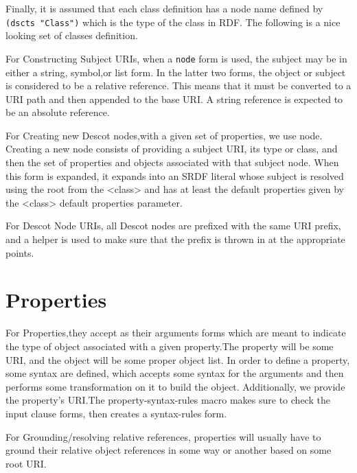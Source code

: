 Finally, it is assumed that each class definition has a node name defined 
by {\tt (dscts "Class")} which is the type of the class in RDF.
The following is a nice looking set of classes definition.

For Constructing Subject URIs, when a {\tt node} form is used, the subject
may be in either a string, symbol,or list form. In the latter two forms, 
the object or subject is considered to be a relative reference. This
means that it must be converted to a URI path and then appended to the 
base URI. A string reference is expected to be an absolute reference.

For Creating new Descot nodes,with a given set of properties, we use node.
Creating a new node consists of providing a subject URI, its type or class, 
and then the set of properties and objects associated with that subject node.
When this form is expanded, it expands into an SRDF literal whose subject 
is resolved using the root from the <class> and has at least the default 
properties given by the <class> default properties parameter.

For Descot Node URIs, all Descot nodes are prefixed with the same URI 
prefix, and a helper is used to make sure that the prefix is thrown in 
at the appropriate points.

\section{Properties}{}%
For Properties,they accept as their arguments forms which are meant to 
indicate the type of object associated with a given property.The property 
will be some URI, and the object will be some proper object list. In order 
to define a property, some syntax are defined, which accepts some 
syntax for the arguments and then performs some transformation on it to 
build the object. Additionally, we provide the property's URI.The 
property-syntax-rules macro makes sure to check the input clause forms,
then creates a syntax-rules form.

For Grounding/resolving relative references, properties will usually 
have to ground their relative object references in some way or another
based on some root URI.

